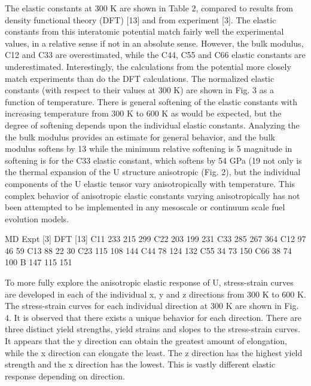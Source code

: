 \documentclass[review]{elsarticle}
\begin{document}
The elastic constants at 300 K are shown in Table 2, compared to results from density functional theory
(DFT) [13] and from experiment [3]. The elastic constants from this interatomic potential match fairly well
the experimental values, in a relative sense if not in an absolute sense. However, the bulk modulus, C12
and C33 are overestimated, while the C44, C55 and C66 elastic constants are underestimated. Interestingly,
the calculations from the potential more closely match experiments than do the DFT calculations. The
normalized elastic constants (with respect to their values at 300 K) are shown in Fig. 3 as a function of
temperature. There is general softening of the elastic constants with increasing temperature from 300 K
to 600 K as would be expected, but the degree of softening depends upon the individual elastic constants.
Analyzing the the bulk modulus provides an estimate for general behavior, and the bulk modulus softens by
13%
while the minimum relative softening is 5%
magnitude in softening is for the C33 elastic constant, which softens by 54 GPa (19%
not only is the thermal expansion of the U structure anisotropic (Fig. 2), but the individual components
of the U elastic tensor vary anisotropically with temperature. This complex behavior of anisotropic elastic constants varying anisotropically has not been attempted to be implemented in any mesoscale or continuum scale fuel evolution models.

MD Expt [3] DFT [13]
C11 233 215 299
C22 203 199 231
C33 285 267 364
C12 97 46 59
C13 88 22 30
C23 115 108 144
C44 78 124 132
C55 34 73 150
C66 38 74 100
B 147 115 151

To more fully explore the anisotropic elastic response of U, stress-strain curves are developed in each
of the individual x, y and z directions from 300 K to 600 K. The stress-strain curves for each individual
direction at 300 K are shown in Fig. 4. It is observed that there exists a unique behavior for each direction.
There are three distinct yield strengths, yield strains and slopes to the stress-strain curves. It appears that
the y direction can obtain the greatest amount of elongation, while the x direction can elongate the least.
The z direction has the highest yield strength and the x direction has the lowest. This is vastly different
elastic response depending on direction.
\end{document}
